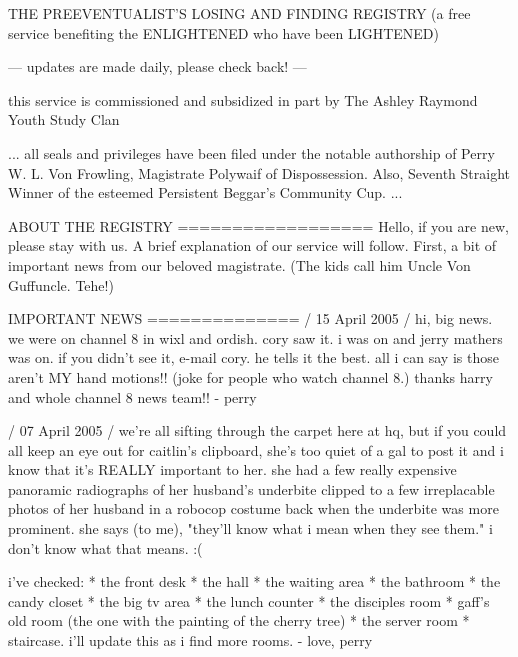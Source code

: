 \documentclass[12pt,twoside]{report}
\begin{document}
\begin{consolecode}

                   THE PREEVENTUALIST'S LOSING AND FINDING REGISTRY
          (a free service benefiting the ENLIGHTENED who have been LIGHTENED)


                                      ---
                      updates are made daily, please check back!
                                      ---


                         this service is commissioned and
                     subsidized in part by The Ashley Raymond
                                Youth Study Clan


                                      ...
                      all seals and privileges have been filed
                under the notable authorship of Perry W. L. Von Frowling,
          Magistrate Polywaif of Dispossession.  Also, Seventh Straight Winner
                   of the esteemed Persistent Beggar's Community Cup.
                                      ...


  ABOUT THE REGISTRY
  ==================
  Hello, if you are new, please stay with us.  A brief explanation of our service
  will follow.  First, a bit of important news from our beloved magistrate.  (The
  kids call him Uncle Von Guffuncle. Tehe!)

  IMPORTANT NEWS
  ==============
  / 15 April 2005 /
  hi, big news.  we were on channel 8 in wixl and ordish.  cory saw it.  i was on
  and jerry mathers was on.  if you didn't see it, e-mail cory.  he tells it the
  best.  all i can say is those aren't MY hand motions!! (joke for people who
  watch channel 8.) thanks harry and whole channel 8 news team!!
                                                   - perry

  / 07 April 2005 /
  we're all sifting through the carpet here at hq, but if you could all keep an
  eye out for caitlin's clipboard, she's too quiet of a gal to post it and i know
  that it's REALLY important to her.  she had a few really expensive panoramic
  radiographs of her husband's underbite clipped to a few irreplacable photos of
  her husband in a robocop costume back when the underbite was more prominent.
  she says (to me), "they'll know what i mean when they see them."  i don't know
  what that means.  :(

  i've checked: * the front desk * the hall * the waiting area * the bathroom *
  the candy closet * the big tv area * the lunch counter * the disciples room *
  gaff's old room (the one with the painting of the cherry tree) * the server
  room * staircase.  i'll update this as i find more rooms.
                                                   - love, perry


\end{consolecode}
\end{document}
